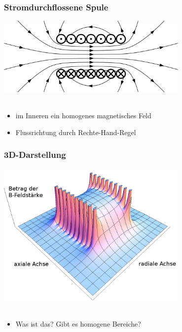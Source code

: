 \begin{frame}
    \frametitle{Stromdurchflossene Spule}
    \begin{center}
		\includegraphics[width=0.7\textwidth,height=.6\textheight,keepaspectratio]{a08/H-Feld.png}\\
		{\tiny \hyperlink{refs}{\cite{wm}}} \\[1em]
		\begin{itemize}
		\item im Inneren ein homogenes magnetisches Feld
		\item Flussrichtung durch Rechte-Hand-Regel
		\end{itemize}
	\end{center}
\end{frame}

\begin{frame}
    \frametitle{3D-Darstellung}
    \begin{center}
		\includegraphics[width=0.7\textwidth,height=.6\textheight,keepaspectratio]{a08/3-D_HFeld.png}\\
		\tiny \hyperlink{refs}{\cite{wm}} \\[1em] \large
		\begin{itemize}
		\item Was ist das? Gibt es homogene Bereiche?
		\end{itemize}
	\end{center}
\end{frame}

